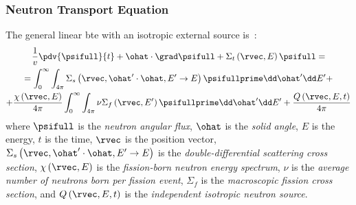 \begin{frame}
        \frametitle{Neutron Transport Equation}
        The general linear \gls{bte} with an isotropic external source is~\cite{Larsen2010}:
        \begin{multline}\label{eq:general-bte}
                \frac{1}{v}\pdv{\psifull}{t} + \ohat\cdot \grad \psifull+\Sigma_t\left(\rvec,E\right)\psifull=\\= \int_{0}^{\infty}\int_{4\pi}\Sigma_s \left(\rvec,\ohat'\cdot \ohat,E'\rightarrow E\right)\psifullprime\dd \ohat' \dd E' +\\+ \frac{\chi \left(\rvec,E\right)}{4\pi }\int_{0}^\infty \int_{4\pi}\nu \Sigma_f \left(\rvec,E'\right)\psifullprime \dd \ohat ' \dd E' +\frac{Q\left(\rvec,E,t\right)}{4\pi}
        \end{multline}
        where $\psifull$ is the \textit{neutron angular flux}, $\ohat$ is the \textit{solid angle}, $E$ is the energy, $t$ is the time, $\rvec$ is the position vector, $\Sigma_s \left(\rvec,\ohat'\cdot \ohat,E'\rightarrow E\right)$ is the \textit{double-differential scattering cross section}, $\chi \left(\rvec,E\right)$ is the \textit{fission-born neutron energy spectrum}, $\nu$ is the \textit{average number of neutrons born per fission event}, $\Sigma_f$ is the \textit{macroscopic fission cross section}, and $Q\left(\rvec,E,t\right)$ is the \textit{independent isotropic neutron source}.
\end{frame}

